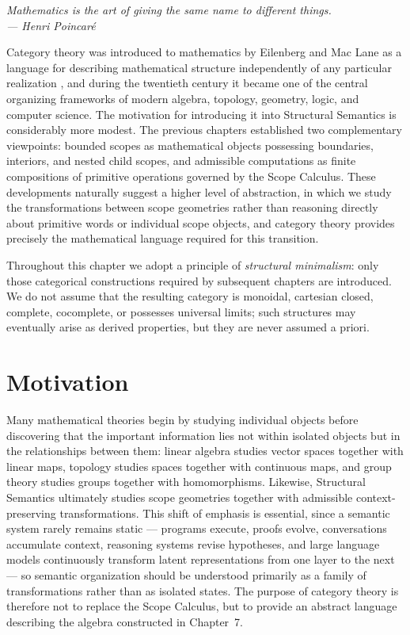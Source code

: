 \documentclass[11pt,twoside,openright]{book}
\numberwithin{equation}{chapter}
\theoremstyle{definition}
\theoremstyle{plain}
\theoremstyle{remark}
\theoremstyle{definition}
\begin{document}
\vspace{1em}
\begin{flushright}\itshape
Mathematics is the art of giving the same name to different things.\\
\upshape --- Henri Poincar\'e
\end{flushright}
\vspace{1em}

Category theory was introduced to mathematics by Eilenberg and Mac Lane as
a language for describing mathematical structure independently of any
particular realization \cite{Eilenberg1945,MacLane1998}, and during the
twentieth century it became one of the central organizing frameworks of
modern algebra, topology, geometry, logic, and computer science. The
motivation for introducing it into Structural Semantics is considerably
more modest. The previous chapters established two complementary
viewpoints: bounded scopes as mathematical objects possessing boundaries,
interiors, and nested child scopes, and admissible computations as finite
compositions of primitive operations governed by the Scope Calculus.
These developments naturally suggest a higher level of abstraction, in
which we study the transformations between scope geometries rather than
reasoning directly about primitive words or individual scope objects, and
category theory provides precisely the mathematical language required for
this transition.

Throughout this chapter we adopt a principle of \emph{structural
minimalism}: only those categorical constructions required by subsequent
chapters are introduced. We do not assume that the resulting category is
monoidal, cartesian closed, complete, cocomplete, or possesses universal
limits; such structures may eventually arise as derived properties, but
they are never assumed a priori.

\section{Motivation}

Many mathematical theories begin by studying individual objects before
discovering that the important information lies not within isolated
objects but in the relationships between them: linear algebra studies
vector spaces together with linear maps, topology studies spaces together
with continuous maps, and group theory studies groups together with
homomorphisms. Likewise, Structural Semantics ultimately studies scope
geometries together with admissible context-preserving transformations.
This shift of emphasis is essential, since a semantic system rarely
remains static --- programs execute, proofs evolve, conversations
accumulate context, reasoning systems revise hypotheses, and large
language models continuously transform latent representations from one
layer to the next --- so semantic organization should be understood
primarily as a family of transformations rather than as isolated states.
The purpose of category theory is therefore not to replace the Scope
Calculus, but to provide an abstract language describing the algebra
constructed in Chapter~7.
\end{document}
